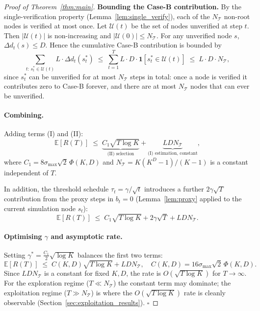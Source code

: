 \begin{proof}[Proof of Theorem~\ref{thm:main}]
\textbf{Bounding the Case-B contribution.}
By the single-verification property (Lemma~\ref{lem:single_verify}), each of the
$N_{\mathcal{T}}$ non-root nodes is verified at most once.  Let $\mathcal{U}(t)$ be the
set of nodes unverified at step $t$.  Then $|\mathcal{U}(t)|$ is non-increasing and
$|\mathcal{U}(0)| \leq N_{\mathcal{T}}$.  For any unverified node $s$, $\Delta d_t(s) \leq D$.
Hence the cumulative Case-B contribution is bounded by
\begin{equation}
  \sum_{t:\,s^*_t \in \mathcal{U}(t)} L \cdot \Delta d_t(s^*_t)
  \;\leq\; \sum_{t=1}^{T} L \cdot D \cdot \mathbf{1}[s^*_t \in \mathcal{U}(t)]
  \;\leq\; L \cdot D \cdot N_{\mathcal{T}},
  \label{eq:caseB}
\end{equation}
since $s^*_t$ can be unverified for at most $N_{\mathcal{T}}$ steps in total: once a
node is verified it contributes zero to Case-B forever, and there are at most
$N_{\mathcal{T}}$ nodes that can ever be unverified.

\paragraph{Combining.}
Adding terms (I) and (II):
\begin{equation}
  \mathbb{E}[R(T)]
  \;\leq\; \underbrace{C_1\sqrt{T\log K}}_{\text{(II) selection}}
         + \underbrace{LDN_{\mathcal{T}}}_{\text{(I) estimation, constant}},
  \label{eq:main_bound}
\end{equation}
where $C_1 = 8\sigma_{\max}\sqrt{2}\,\Phi(K,D)$ and
$N_{\mathcal{T}} = K(K^D-1)/(K-1)$ is a constant independent of $T$.

In addition, the threshold schedule $\tau_t = \gamma/\sqrt{t}$ introduces a further
$2\gamma\sqrt{T}$ contribution from the proxy steps in $b_t = 0$ (Lemma~\ref{lem:proxy}
applied to the current simulation node $s_t$):
\[
  \mathbb{E}[R(T)]
  \;\leq\; C_1\sqrt{T\log K} + 2\gamma\sqrt{T} + LDN_{\mathcal{T}}.
\]

\paragraph{Optimising $\gamma$ and asymptotic rate.}
Setting $\gamma^* = \tfrac{C_1}{2}\sqrt{\log K}$ balances the first two terms:
\[
  \mathbb{E}[R(T)]
  \;\leq\; C(K,D)\sqrt{T\log K} + LDN_{\mathcal{T}},
  \quad C(K,D) = 16\sigma_{\max}\sqrt{2}\,\Phi(K,D).
\]
Since $LDN_{\mathcal{T}}$ is a constant for fixed $K, D$, the rate is
$O(\sqrt{T\log K})$ for $T \to \infty$.  For the exploration regime
($T \ll N_{\mathcal{T}}$) the constant term may dominate; the exploitation regime
($T \gg N_{\mathcal{T}}$) is where the $O(\sqrt{T\log K})$ rate is cleanly observable
(Section~\ref{sec:exploitation_results}).  $\square$


\end{proof}
